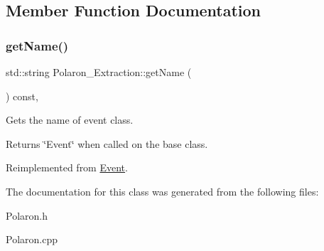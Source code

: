 \subsection{Member Function Documentation}
\mbox{\label{class_polaron___extraction_a30cc8c9489f69e24feda42c035adc9cf}} 
\subsubsection{\texorpdfstring{get\+Name()}{getName()}}
{\footnotesize\ttfamily std\+::string Polaron\+\_\+\+Extraction\+::get\+Name (\begin{DoxyParamCaption}{ }\end{DoxyParamCaption}) const\hspace{0.3cm}{\ttfamily [inline]}, {\ttfamily [virtual]}}



Gets the name of event class. 

\begin{DoxyReturn}{Returns}
\char`\"{}\+Event\char`\"{} when called on the base class. 
\end{DoxyReturn}


Reimplemented from \hyperlink{class_event_a8c38a406d844d05eac1ef007bad2487f}{Event}.



The documentation for this class was generated from the following files\+:\begin{DoxyCompactItemize}
\item 
Polaron.\+h\item 
Polaron.\+cpp\end{DoxyCompactItemize}

